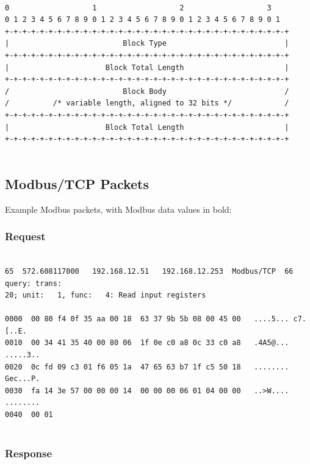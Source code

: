 \documentclass[11pt,]{article}
\begin{document}
\newpage

\begin{verbatim}

0                   1                   2                   3
0 1 2 3 4 5 6 7 8 9 0 1 2 3 4 5 6 7 8 9 0 1 2 3 4 5 6 7 8 9 0 1
+-+-+-+-+-+-+-+-+-+-+-+-+-+-+-+-+-+-+-+-+-+-+-+-+-+-+-+-+-+-+-+-+
|                          Block Type                           |
+-+-+-+-+-+-+-+-+-+-+-+-+-+-+-+-+-+-+-+-+-+-+-+-+-+-+-+-+-+-+-+-+
|                      Block Total Length                       |
+-+-+-+-+-+-+-+-+-+-+-+-+-+-+-+-+-+-+-+-+-+-+-+-+-+-+-+-+-+-+-+-+
/                          Block Body                           /
/          /* variable length, aligned to 32 bits */            /
+-+-+-+-+-+-+-+-+-+-+-+-+-+-+-+-+-+-+-+-+-+-+-+-+-+-+-+-+-+-+-+-+
|                      Block Total Length                       |
+-+-+-+-+-+-+-+-+-+-+-+-+-+-+-+-+-+-+-+-+-+-+-+-+-+-+-+-+-+-+-+-+    
    
\end{verbatim}

\subsection{Modbus/TCP Packets}\label{modbustcp-packets}

Example Modbus packets, with Modbus data values in bold:

\subsubsection{Request}\label{request}

\begin{verbatim}

65  572.608117000   192.168.12.51   192.168.12.253  Modbus/TCP  66     query: trans:
20; unit:   1, func:   4: Read input registers

0000  00 80 f4 0f 35 aa 00 18  63 37 9b 5b 08 00 45 00   ....5... c7.[..E.
0010  00 34 41 35 40 00 80 06  1f 0e c0 a8 0c 33 c0 a8   .4A5@... .....3..
0020  0c fd 09 c3 01 f6 05 1a  47 65 63 b7 1f c5 50 18   ........ Gec...P.
0030  fa 14 3e 57 00 00 00 14  00 00 00 06 01 04 00 00   ..>W.... ........
0040  00 01    
    
\end{verbatim}

\subsubsection{Response}\label{response}
\end{document}
